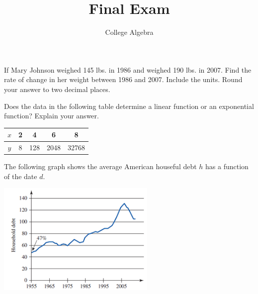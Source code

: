 \documentclass[12pt,addpoints]{exam}
\title{\vspace{-1in}Final Exam}
\author{College Algebra}
\date{}
\begin{document}
\maketitle


\begin{questions}
	\question[5] If Mary Johnson weighed 145 lbs. in 1986 and weighed 190 lbs. in 2007. Find the rate of change in her weight between 1986 and 2007. Include the units. Round your answer to two decimal places.
	\vspace{\fill}   

	\question[5] Does the data in the following table determine a linear function or an exponential function? Explain your answer.
	
\begin{tabular}{|c|c|c|c|c|}
	\hline
	$x$ & 2 & 4 & 6 & 8 \\ \hline
	$y$ & 8 & 128 & 2048 & 32768 \\ \hline
\end{tabular}
	\vspace{\fill}

	\question The following graph shows the average American houseful debt $h$ has a function of the date $d$.
	
	\includegraphics[width=3in]{final_exam_1.png}
	
\end{questions}
\end{document}
